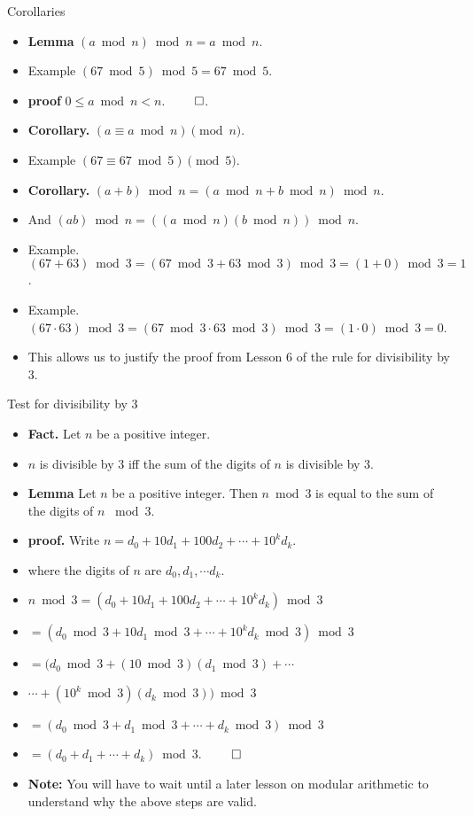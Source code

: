 \documentclass[handout]{beamer}
\begin{document}
\begin{frame}{Corollaries}
\begin{itemize}
  \item \textbf{Lemma} $(a\bmod n)\bmod n = a\bmod n$.
  \item Example $(67 \bmod 5)\bmod 5 = 67 \bmod 5$.
  \item \textbf{proof} $0\leq a \bmod n < n$. $\qed$.
  \item \textbf{Corollary.} $(a\equiv a\bmod n) \pmod n$.
  \item Example $(67 \equiv 67 \bmod 5) \pmod 5$.
  \item \textbf{Corollary.} $(a+b)\bmod n = (a\bmod n + b\bmod n) \bmod n$.
  \item And $(ab)\bmod n = \left((a\bmod n)(b\bmod n)\right)\bmod n$.
  \item Example. $(67 + 63) \bmod 3 = (67 \bmod 3 + 63 \bmod 3) \bmod 3 = (1+0)\bmod 3 = 1$.
  \item Example. $(67 \cdot 63) \bmod 3 = (67 \bmod 3 \cdot 63 \bmod 3) \bmod 3 = (1\cdot 0)\bmod 3 = 0$.
  \item This allows us to justify the proof from Lesson 6 of the rule for divisibility by 3.
\end{itemize}
\end{frame}

\begin{frame}{Test for divisibility by 3}
\begin{itemize}
  \item \textbf{Fact.} Let $n$ be a positive integer.
  \item $n$ is divisible by 3 iff the sum of the digits of $n$ is divisible by 3.
  \item \textbf{Lemma} Let $n$ be a positive integer. Then $n\bmod 3$ is equal to the
  sum of the digits of $n$ $\bmod 3$.
  \item \textbf{proof.} Write $n=d_0 + 10d_1 + 100 d_2 + \cdots + 10^k d_k$.
  \item where the digits of $n$ are $d_0,d_1,\cdots d_k$.
  \item $n\bmod 3 = (d_0 + 10d_1 + 100 d_2 + \cdots + 10^k d_k)\bmod 3$
  \item  $=\left(d_0\bmod 3 + 10d_1\bmod 3 + \cdots + 10^k d_k \bmod 3 \right) \bmod 3$
  \item  $=\big(d_0\bmod 3 + (10\bmod 3)(d_1\bmod 3) + \cdots $
  \item  $  \cdots + (10^k\bmod 3) (d_k \bmod 3) \big) \bmod 3$
  \item  $=\left(d_0\bmod 3 + d_1\bmod 3 + \cdots + d_k \bmod 3 \right) \bmod 3$
  \item  $=\left(d_0 + d_1 + \cdots + d_k  \right) \bmod 3$. $\qed$
  \item \textbf{Note:} You will have to wait until a later lesson on modular arithmetic
  to understand why the above steps are valid.
\end{itemize}
\end{frame}
\end{document}
